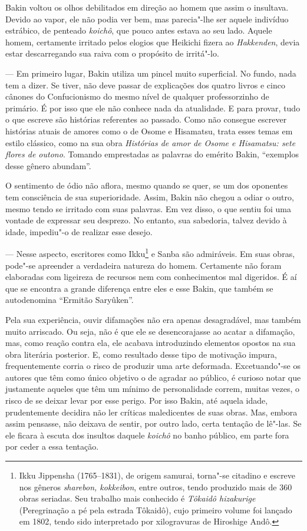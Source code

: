 Bakin voltou os olhos debilitados em direção ao homem que assim o
insultava. Devido ao vapor, ele não podia ver bem, mas parecia"-lhe ser
aquele indivíduo estrábico, de penteado \textit{koichô}, que pouco
antes estava ao seu lado. Aquele homem, certamente irritado pelos
elogios que Heikichi fizera ao \textit{Hakkenden}, devia estar
descarregando sua raiva com o propósito de irritá"-lo.

--- Em primeiro lugar, Bakin utiliza um pincel muito superficial. No
fundo, nada tem a dizer. Se tiver, não deve passar de explicações dos
quatro livros e cinco cânones do Confucionismo do mesmo nível de
qualquer professorzinho de primário. É por isso que ele não conhece
nada da atualidade. E para provar, tudo o que escreve são histórias
referentes ao passado. Como não consegue escrever histórias atuais de
amores como o de Osome e Hisamatsu, trata esses temas em estilo
clássico, como na sua obra \textit{Histórias de amor de Osome e
Hisamatsu: sete flores de outono}. Tomando emprestadas as palavras do
emérito Bakin, ``exemplos desse gênero abundam''.

O sentimento de ódio não aflora, mesmo quando se quer, se um dos
oponentes tem consciência de sua superioridade. Assim, Bakin não chegou
a odiar o outro, mesmo tendo se irritado com suas palavras. Em vez
disso, o que sentiu foi uma vontade de expressar seu desprezo. No
entanto, sua sabedoria, talvez devido à idade, impediu"-o de realizar
esse desejo.

--- Nesse aspecto, escritores como Ikku\footnote{ Ikku Jippensha 
(1765--1831), de origem samurai, torna"-se citadino e escreve nos
gêneros \textit{sharebon, kokkeibon}, entre outros, tendo produzido mais de
360 obras seriadas. Seu trabalho mais conhecido é \textit{Tôkaidô hizakurige} 
(Peregrinação a pé pela estrada Tôkaidô), cujo primeiro
volume foi lançado em 1802, tendo sido interpretado por xilogravuras de 
Hiroshige Andô.} e Sanba são admiráveis. Em suas obras, pode"-se
apreender a verdadeira natureza do homem. Certamente não foram
elaboradas com ligeireza de recursos nem com conhecimentos mal
digeridos. É aí que se encontra a grande diferença entre eles e esse
Bakin, que também se autodenomina ``Ermitão Saryûken''.

Pela sua experiência, ouvir difamações não era apenas desagradável, mas
também muito arriscado. Ou seja, não é que ele se desencorajasse ao
acatar a difamação, mas, como reação contra ela, ele acabava
introduzindo elementos opostos na sua obra literária posterior. E, como
resultado desse tipo de motivação impura, frequentemente corria o risco
de produzir uma arte deformada. Excetuando"-se os autores que têm como
único objetivo o de agradar ao público, é curioso notar que justamente
aqueles que têm um mínimo de personalidade correm, muitas vezes, o
risco de se deixar levar por esse perigo. Por isso Bakin, até aquela
idade, prudentemente decidira não ler críticas maledicentes de suas
obras. Mas, embora assim pensasse, não deixava de sentir, por outro
lado, certa tentação de lê"-las. Se ele ficara à escuta dos insultos
daquele \textit{koichô} no banho público, em parte fora por ceder a
essa tentação.

